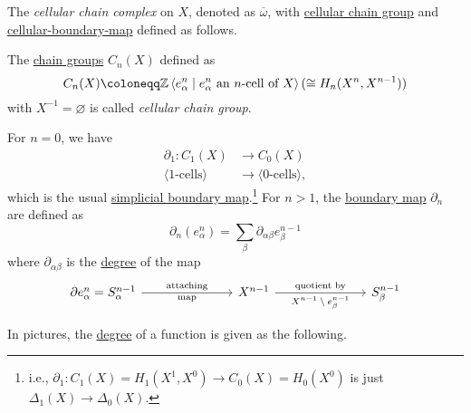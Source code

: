 \begin{definition}\label{def:cellular-chain-complex}
	The \emph{cellular chain complex} on \(X\), denoted as \(\overline{\omega}\), with \hyperref[def:cellular-chain-group]{cellular chain group}
	and \hyperref[def:cellular-boundary-map]{cellular-boundary-map} defined as follows.
	\begin{definition}\label{def:cellular-chain-group}
		The \hyperref[def:chain-group]{chain groups} \(C_{n} (X)\) defined as
		\[
			C_{n} (X) \coloneqq \mathbb{\MakeUppercase{z}} \left< e^n_\alpha \mid e^n_\alpha \text{ an \(n\)-cell of \(X\)}\right> (\cong H_n(X^n, X^{n-1}))
		\]
		with \(X^{-1} = \varnothing\) is called \emph{cellular chain group}.
	\end{definition}

	\begin{definition}\label{def:cellular-boundary-map}
		For \(n=0\), we have
		\[
			\begin{split}
				\partial _1 \colon C_1(X)            & \to C_0(X)                       \\
				\langle \text{1-cells} \rangle & \to \langle \text{0-cells} \rangle,
			\end{split}
		\]
		which is the usual \hyperref[def:boundary-homomorphism]{simplicial boundary map}.\footnote{i.e.,
			\(\partial _1 \colon C_1(X)=H_1(X^1,X^0) \to C_0(X)=H_0(X^0)\) is just \(\Delta _1(X)\to \Delta _0(X)\).}
		For \(n > 1\), the \hyperref[def:boundary-homomorphism]{boundary map} \(\partial _{n}\) are defined as
		\[
			\partial _n(e_\alpha^n) = \sum_\beta \partial _{\alpha\beta} e_\beta^{n - 1}
		\]
		where \(\partial _{\alpha\beta}\) is the \hyperref[def:degree]{degree} of the map
		\[
			\begin{tikzcd}
				{\partial e^n_\alpha=S^{n-1}_{\alpha}} &&& {X^{n-1}} &&& {S^{n-1}_\beta}
				\arrow["{\text{attaching}}", "{\text{map}}"', from=1-1, to=1-4]
				\arrow["{\text{quotient by}}", "{\text{\(X^{n-1} \setminus e^{n-1}_\beta\)}}"', from=1-4, to=1-7]
			\end{tikzcd}
		\]
	\end{definition}
\end{definition}
\begin{eg}
	In pictures, the \hyperref[def:degree]{degree} of a function is given as the following.
	\begin{figure}[H]
		\centering
		\label{fig:cellular-boundary-map}
	\end{figure}
\end{eg}
